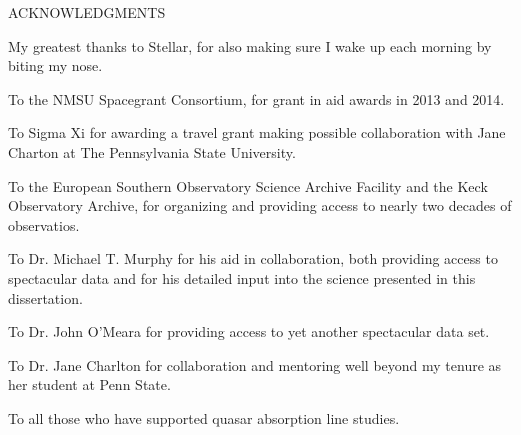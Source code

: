\begin{center}
ACKNOWLEDGMENTS
\end{center}

My greatest thanks to Stellar, for also making sure I wake up each morning by biting my nose.

To the NMSU Spacegrant Consortium, for grant in aid awards in 2013 and 2014.

To Sigma Xi for awarding a travel grant making possible collaboration with Jane Charton at The Pennsylvania State University.

To the European Southern Observatory Science Archive Facility and the Keck Observatory Archive, for organizing and providing access to nearly two decades of observatios.

To Dr. Michael T. Murphy for his aid in collaboration, both providing access to spectacular data and for his detailed input into the science presented in this dissertation.

To Dr. John O'Meara for providing access to yet another spectacular data set.

To Dr. Jane Charlton for collaboration and mentoring well beyond my tenure as her student at Penn State.

To all those who have supported quasar absorption line studies.
